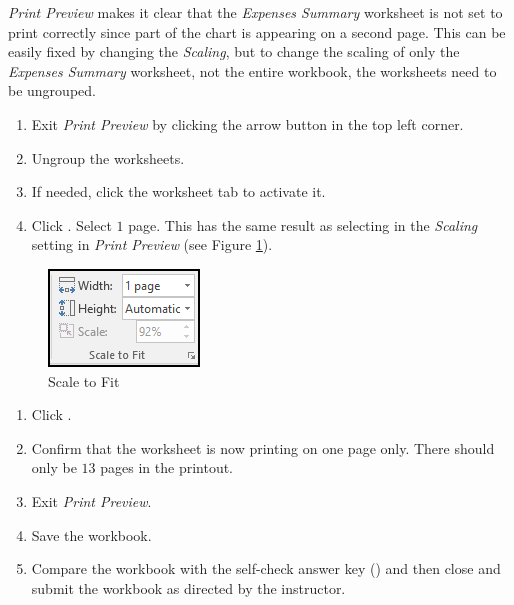 \textit{Print Preview} makes it clear that the \textit{Expenses Summary} worksheet is not set to print correctly since part of the chart is appearing on a second page. This can be easily fixed by changing the \textit{Scaling}, but to change the scaling of only the \textit{Expenses Summary} worksheet, not the entire workbook, the worksheets need to be ungrouped.

\begin{enumbox}
	\begin{enumerate}
		\item Exit \textit{Print Preview} by clicking the arrow button in the top left corner.
		\item Ungroup the worksheets.
		\item If needed, click the  worksheet tab to activate it.
		\item Click . Select $ 1 $ page. This has the same result as selecting  in the \textit{Scaling} setting in \textit{Print Preview} (see Figure \ref{06:fig16}).
	\end{enumerate}
\end{enumbox}

\begin{figure}[H]
	\centering
	\includegraphics[width=\maxwidth{.35\linewidth}]{gfx/ch06_fig16}
	\caption{Scale to Fit}
	\label{06:fig16}
\end{figure}

\begin{enumbox}
	\begin{enumerate}
		\item Click .
		\item Confirm that the  worksheet is now printing on one page only. There should only be $ 13 $ pages in the printout.
		\item Exit \textit{Print Preview}.
		\item Save the  workbook.
		\item Compare the workbook with the self-check answer key () and then close and submit the  workbook as directed by the instructor.
	\end{enumerate}
\end{enumbox}
	
